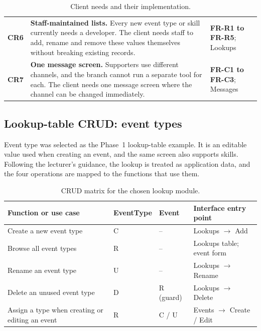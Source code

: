 \begin{table}[H]
\begin{tabularx}{\textwidth}{@{}L{0.05\textwidth}YL{0.28\textwidth}@{}}
\addlinespace[1.5pt]
\textbf{CR6} & \textbf{Staff-maintained lists.} Every new event type or skill currently needs a developer. The client needs staff to add, rename and remove these values themselves without breaking existing records. & \textbf{FR-R1 to FR-R5}; Lookups \\
\addlinespace[1.5pt]
\textbf{CR7} & \textbf{One message screen.} Supporters use different channels, and the branch cannot run a separate tool for each. The client needs one message screen where the channel can be changed immediately. & \textbf{FR-C1 to FR-C3}; Messages \\
\bottomrule
\end{tabularx}
\caption{Client needs and their implementation.}
\label{tab:cr}
\end{table}

\subsection{Lookup-table CRUD: event types}

Event type was selected as the Phase~1 lookup-table example. It is an editable value used when creating an event, and the same screen also supports skills. Following the lecturer's guidance, the lookup is treated as application data, and the four operations are mapped to the functions that use them.

\begin{table}[H]
\centering
\small
\begin{tabularx}{\textwidth}{@{}L{0.36\textwidth}L{0.14\textwidth}L{0.13\textwidth}Y@{}}
\toprule
\textbf{Function or use case} & \textbf{EventType} & \textbf{Event} & \textbf{Interface entry point} \\
\midrule
Create a new event type & C & -- & Lookups \(\rightarrow\) Add \\
Browse all event types & R & -- & Lookups table; event form \\
Rename an event type & U & -- & Lookups \(\rightarrow\) Rename \\
Delete an unused event type & D & R (guard) & Lookups \(\rightarrow\) Delete \\
Assign a type when creating or editing an event & R & C / U & Events \(\rightarrow\) Create / Edit \\
\bottomrule
\end{tabularx}
\caption{CRUD matrix for the chosen lookup module.}
\label{tab:crud}
\end{table}


